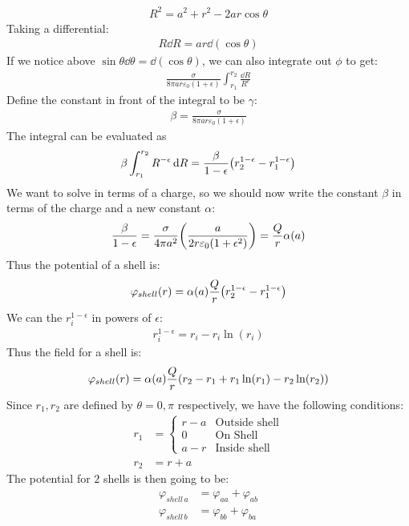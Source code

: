 \documentclass[12pt]{article}
\newcommand{\vphi}{\varphi}
\newcommand{\eps}{\epsilon}
\begin{document}
\begin{align*}
  R^2=a^2+r^2-2ar\cos\theta
\end{align*}
Taking a differential:
\begin{align*}
  R\dd{R}=ar\dd{(\cos\theta)}
\end{align*}
If we notice above $\sin\theta\dd{\theta}=\dd{(\cos\theta)}$, we can also integrate out $\phi$ to get:
\begin{align*}
  \frac\sigma{8\pi ar\varepsilon_0(1+\eps)}
  \int_{r_1}^{r_2}\frac{\dd{R}}{R^\eps}
\end{align*}
Define the constant in front of the integral to be $\gamma$:
\begin{align*}
  \beta=\frac\sigma{8\pi ar\varepsilon_0(1+\eps)}
\end{align*}
The integral can be evaluated as
\begin{align*}
  \beta\int_{r_1}^{r_2}R^{-\eps}\dd{R}=\frac\beta{1-\eps}
  \qty(r_2^{1-\eps}-r_1^{1-\eps})
\end{align*}
We want to solve in terms of a charge, so we should now write the constant $\beta$ in terms of the charge and a new constant $\alpha$:
\begin{align*}
  \frac\beta{1-\eps}=\frac\sigma{4\pi a^2}\qty(\frac{a}{2r\varepsilon_0(1+\eps^2)})=\frac{Q}{r}\alpha(a)
\end{align*}
Thus the potential of a shell is:
\begin{align*}
  \vphi_{shell}(r)=\alpha(a)\frac{Q}r\qty(r_2^{1-\eps}-r_1^{1-\eps})
\end{align*}
We can the $r_i^{1-\eps}$ in powers of $\eps$:
\begin{align*}
  r_i^{1-\eps}=r_i-r_i\ln(r_i)
\end{align*}
Thus the field for a shell is:
\begin{align*}
  \vphi_{shell}(r)=\alpha(a)\frac{Q}r\qty(r_2-r_1+r_1\ln(r_1)-r_2\ln(r_2))
\end{align*}
Since $r_1,r_2$ are defined by $\theta=0,\pi$ respectively, we have the following conditions:
\begin{align*}
  r_1&=
  \begin{cases}
    r-a & \text{Outside shell}\\
    0 & \text{On Shell}\\
    a-r & \text{Inside shell}
  \end{cases}\\
  r_2&=r+a
\end{align*}
The potential for $2$ shells is then going to be:
\begin{align*}
  \vphi_{shell\,a}&=\vphi_{aa}+\vphi_{ab}\\
  \vphi_{shell\,b}&=\vphi_{bb}+\vphi_{ba}
\end{align*}
\end{document}
